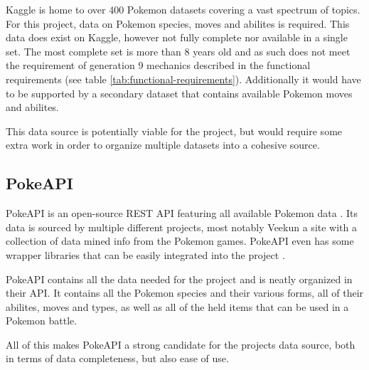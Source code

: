 Kaggle is home to over 400 Pokemon datasets \cite{PokemonKaggleDataSets} covering a vast spectrum of topics. For this project, data on Pokemon species,
moves and abilites is required. This data does exist on Kaggle, however not fully complete nor available in a single set. The most complete set \cite{PokemonDataSetWithStats} is 
more than 8 years old and as such does not meet the requirement of generation 9 mechanics described in the functional requirements (see table \ref{tab:functional-requirements}).
Additionally it would have to be supported by a secondary dataset that contains available Pokemon moves and abilites.

This data source is potentially viable for the project, but would require some extra work in order to organize multiple datasets into a cohesive source.

\subsection{PokeAPI}
PokeAPI is an open-source REST API featuring all available Pokemon data \cite{PokeAPI}. Its data is sourced by multiple different projects, most notably 
Veekun \cite{Veekun} a site with a collection of data mined info from the Pokemon games. PokeAPI even has some wrapper libraries that can be easily integrated
into the project \cite{PokeAPIWrapperLibs}. 

PokeAPI contains all the data needed for the project and is neatly organized in their API. It contains all the Pokemon species and their various forms, 
all of their abilites, moves and types, as well as all of the held items that can be used in a Pokemon battle. 

All of this makes PokeAPI a strong candidate for the projects data source, both in terms of data completeness, but also ease of use.

